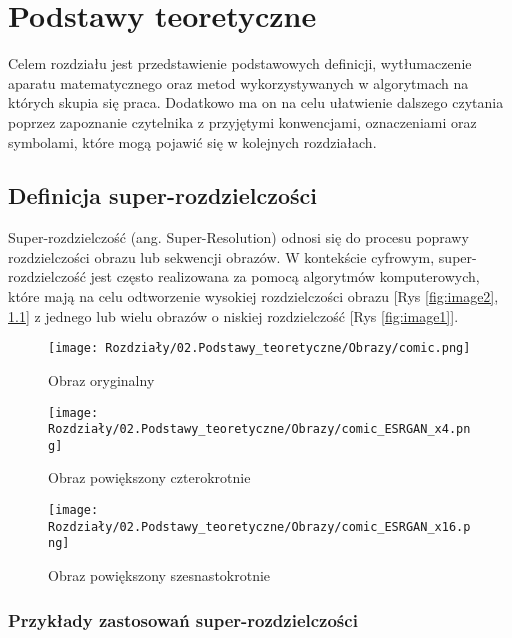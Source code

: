 \chapter{Podstawy teoretyczne} \label{chap:podstawy_teoretyczne}

Celem rozdziału jest przedstawienie podstawowych definicji, wytłumaczenie aparatu matematycznego oraz metod wykorzystywanych w algorytmach na których skupia się praca. Dodatkowo ma on na celu ułatwienie dalszego czytania poprzez zapoznanie czytelnika z przyjętymi konwencjami, oznaczeniami oraz symbolami, które mogą pojawić się w kolejnych rozdziałach. 


\section{Definicja super-rozdzielczości}

Super-rozdzielczość (ang. Super-Resolution) odnosi się do procesu poprawy rozdzielczości obrazu lub sekwencji obrazów. W kontekście cyfrowym, super-rozdzielczość jest często realizowana za pomocą algorytmów komputerowych, które mają na celu odtworzenie wysokiej rozdzielczości obrazu [Rys \ref{fig:image2}, \ref{fig:image3}] z jednego lub wielu obrazów o niskiej rozdzielczość [Rys \ref{fig:image1}].

\begin{figure}[ht]
    \centering
    \begin{minipage}[t]{0.3\linewidth}
        \texttt{[image: Rozdziały/02.Podstawy\_teoretyczne/Obrazy/comic.png]}
        \caption{Obraz oryginalny}
        \label{fig:image1}
    \end{minipage}
    \hspace{0.5cm}
    \begin{minipage}[t]{0.3\linewidth}
        \texttt{[image: Rozdziały/02.Podstawy\_teoretyczne/Obrazy/comic\_ESRGAN\_x4.png]}
        \caption{Obraz powiększony czterokrotnie}
        \label{fig:image2}
    \end{minipage}
    \hspace{0.5cm}
    \begin{minipage}[t]{0.3\linewidth}
        \texttt{[image: Rozdziały/02.Podstawy\_teoretyczne/Obrazy/comic\_ESRGAN\_x16.png]}
        \caption{Obraz powiększony szesnastokrotnie}
        \label{fig:image3}
    \end{minipage}
\end{figure}

\subsection*{Przykłady zastosowań super-rozdzielczości}

